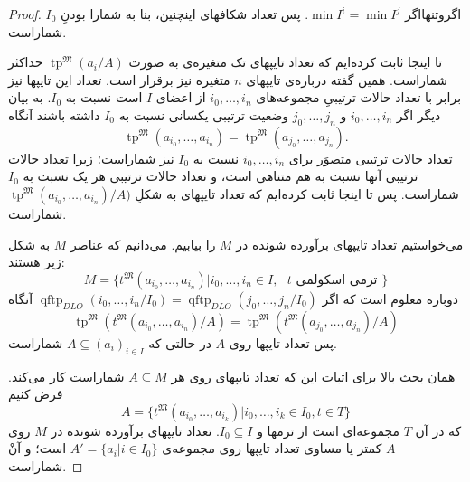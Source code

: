\documentclass[12pt,a4paper]{report}
\theoremstyle{colorhead}
\DeclareMathOperator{\qftp}{qftp}
\DeclareMathOperator{\tp}{tp}
\begin{document}
\begin{proof}
اگروتنهااگر
$\min I^i=\min I^j$.
پس تعداد شکافهای اینچنین، بنا به شمارا بودنِ
$I_0$
شماراست.
\par 
تا اینجا ثابت کرده‌ایم که تعداد تایپهای
تک متغیره‌ی به صورت
$\tp^\mathfrak{M}(a_i/A)$
حداکثر شماراست. همین گفته درباره‌ی تایپهای
$n$
متغیره نیز برقرار است. تعداد این تایپها نیز برابر با تعداد
حالات ترتیبیِ مجموعه‌های
$i_0,\ldots,i_n$
از اعضای
$I$
است نسبت به
$I_0$.
به بیان دیگر اگر
$i_0,\ldots,i_n$
و
$j_0,\ldots,j_n$
وضعیت ترتیبی یکسانی نسبت به
$I_0$
داشته باشند آنگاه
\[\tp^\mathfrak{M}(a_{i_0},\ldots,a_{i_n})=\tp^\mathfrak{M}(a_{j_0},\ldots,a_{j_n}).\]
تعداد حالات ترتیبی متصوَر برای
$i_0,\ldots,i_n$
نسبت به
$I_0$
نیز شماراست؛ زیرا تعداد حالات ترتیبی آنها نسبت به هم متناهی است، و تعداد حالات ترتیبی هر یک نسبت به 
$I_0$
شماراست.
پس تا اینجا ثابت کرده‌ایم که تعداد تایپهای به شکلِ
$\tp^\mathfrak{M}(a_{i_0},\ldots,a_{i_n})/A)$
شماراست.
\par 
می‌خواستیم تعداد تایپهای برآورده شونده در
$M$
را بیابیم. می‌دانیم که عناصر 
$M$
به شکل زیر هستند:
\[
M=\{t^\mathfrak{M}(a_{i_0},\ldots,a_{i_n})|i_0,\ldots,i_n\in I, \text{ $t$ ترمی اسکولمی }\}
\]
دوباره معلوم است که اگر
$\qftp_{DLO}(i_0,\ldots,i_n/I_0)=\qftp_{DLO}(j_0,\ldots,j_n/I_0)$
آنگاه 
\[
\tp^\mathfrak{M}(t^\mathfrak{M}(a_{i_0},\ldots,a_{i_n})/A)=
\tp^\mathfrak{M}(t^\mathfrak{M}(a_{j_0},\ldots,a_{j_n})/A)
\]
پس تعداد تایپها روی
$A$
در حالتی که
$A\subseteq (a_i)_{i\in I}$
شماراست. 
\par 
همان بحث بالا برای اثبات این که تعداد تایپهای روی هر
$A\subseteq M$
شماراست کار می‌کند. 
فرض کنیم
\[
A=\{t^\mathfrak{M}(a_{i_0},\ldots,a_{i_k})|i_0,\ldots,i_k\in I_0, t\in T\}
\]
که در آن
$T$
مجموعه‌ای است از ترمها و
$I_0\subseteq I$.
تعداد تایپهای 
برآورده شونده در
$M$
روی
$A$
کمتر یا مساوی تعداد تایپها روی مجموعه‌ی
$A'=\{a_{i}|i\in I_0\}$
است؛ و آنْ شماراست. 
\end{proof}
\end{document}
